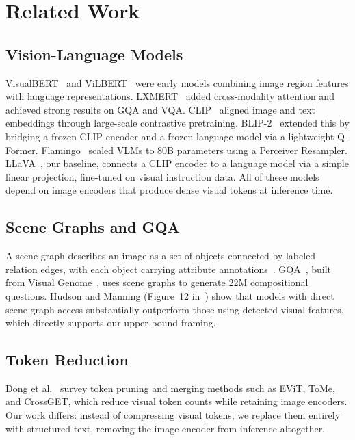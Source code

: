 \documentclass[10pt,twocolumn]{article}
\begin{document}
\section{Related Work}

\subsection{Vision-Language Models}

VisualBERT~\cite{li2019visualbert} and ViLBERT~\cite{lu2019vilbert} were early models combining image region features with language representations. LXMERT~\cite{tan2019lxmert} added cross-modality attention and achieved strong results on GQA and VQA. CLIP~\cite{radford2021clip} aligned image and text embeddings through large-scale contrastive pretraining. BLIP-2~\cite{li2023blip2} extended this by bridging a frozen CLIP encoder and a frozen language model via a lightweight Q-Former. Flamingo~\cite{alayrac2022flamingo} scaled VLMs to 80B parameters using a Perceiver Resampler. LLaVA~\cite{liu2023llava}, our baseline, connects a CLIP encoder to a language model via a simple linear projection, fine-tuned on visual instruction data. All of these models depend on image encoders that produce dense visual tokens at inference time.

\subsection{Scene Graphs and GQA}

A scene graph describes an image as a set of objects connected by labeled relation edges, with each object carrying attribute annotations~\cite{xu2017scene}. GQA~\cite{hudson2019gqa}, built from Visual Genome~\cite{krishna2017visual}, uses scene graphs to generate 22M compositional questions. Hudson and Manning (Figure~12 in~\cite{hudson2019gqa}) show that models with direct scene-graph access substantially outperform those using detected visual features, which directly supports our upper-bound framing.

\subsection{Token Reduction}

Dong et al.~\cite{dong2024efficient} survey token pruning and merging methods such as EViT, ToMe, and CrossGET, which reduce visual token counts while retaining image encoders. Our work differs: instead of compressing visual tokens, we replace them entirely with structured text, removing the image encoder from inference altogether.
\end{document}
